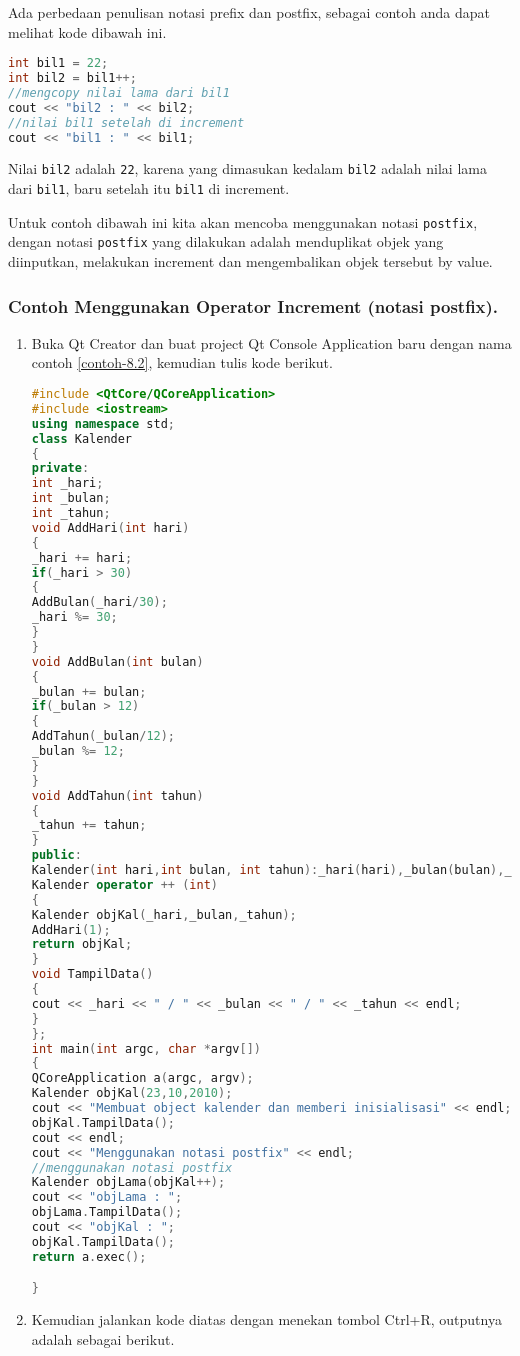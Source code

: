 Ada perbedaan penulisan notasi prefix dan postfix, sebagai contoh anda
dapat melihat kode dibawah ini.

\begin{lstlisting}[language=c++, numbers=none]
int bil1 = 22;
int bil2 = bil1++;
//mengcopy nilai lama dari bil1
cout << "bil2 : " << bil2;
//nilai bil1 setelah di increment
cout << "bil1 : " << bil1;
\end{lstlisting}

Nilai \texttt{bil2} adalah \texttt{22}, karena yang dimasukan kedalam
\texttt{bil2} adalah nilai lama dari \texttt{bil1}, baru setelah itu
\texttt{bil1} di increment.

Untuk contoh dibawah ini kita akan mencoba menggunakan notasi
\texttt{postfix}, dengan notasi \texttt{postfix} yang dilakukan adalah
menduplikat objek yang diinputkan, melakukan increment dan mengembalikan
objek tersebut by value.

\subsubsection*{Contoh  Menggunakan Operator Increment (notasi postfix).}

\begin{enumerate}
\def\labelenumi{\arabic{enumi}.}
\item
  Buka Qt Creator dan buat project Qt Console Application baru dengan
  nama contoh \ref{contoh-8.2}, kemudian tulis kode berikut.

\begin{lstlisting}[language=c++, caption=Menggunakan Operator Increment (notasi postfix), label=contoh-8.2]
#include <QtCore/QCoreApplication>
#include <iostream>
using namespace std;
class Kalender
{
private:
int _hari;
int _bulan;
int _tahun;
void AddHari(int hari)
{
_hari += hari;
if(_hari > 30)
{
AddBulan(_hari/30);
_hari %= 30;
}
}
void AddBulan(int bulan)
{
_bulan += bulan;
if(_bulan > 12)
{
AddTahun(_bulan/12);
_bulan %= 12;
}
}
void AddTahun(int tahun)
{
_tahun += tahun;
}
public:
Kalender(int hari,int bulan, int tahun):_hari(hari),_bulan(bulan),_tahun(tahun){ }
Kalender operator ++ (int)
{
Kalender objKal(_hari,_bulan,_tahun);
AddHari(1);
return objKal;
}
void TampilData()
{
cout << _hari << " / " << _bulan << " / " << _tahun << endl;
}
};
int main(int argc, char *argv[])
{
QCoreApplication a(argc, argv);
Kalender objKal(23,10,2010);
cout << "Membuat object kalender dan memberi inisialisasi" << endl;
objKal.TampilData();
cout << endl;
cout << "Menggunakan notasi postfix" << endl;
//menggunakan notasi postfix
Kalender objLama(objKal++);
cout << "objLama : ";
objLama.TampilData();
cout << "objKal : ";
objKal.TampilData();
return a.exec();

}
\end{lstlisting}
\item
  Kemudian jalankan kode diatas dengan menekan tombol Ctrl+R, outputnya
  adalah sebagai berikut.
\end{enumerate}


